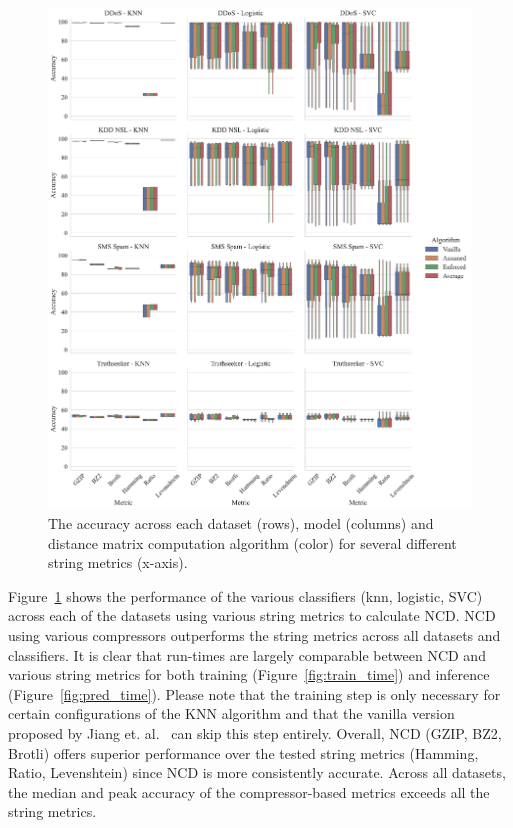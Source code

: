 \documentclass[conference]{IEEEtran}
\begin{document}
\begin{figure}[htb]
    \centering
    \includegraphics[width=\textwidth]{images/accuracy_vs_algorithm.pdf}
    \caption{The accuracy across each dataset (rows), model (columns) and distance matrix computation algorithm (color) for several different string metrics (x-axis).}
    \label{fig:metric_acc}
\end{figure}

Figure~\ref{fig:metric_acc} shows the performance of the various classifiers (knn, logistic, SVC) across each of the datasets using various string metrics to calculate NCD. 
NCD using various compressors outperforms the string metrics across all datasets and classifiers. 
It is clear that run-times are largely comparable between NCD and various string metrics for both training (Figure~\ref{fig:train_time}) and inference (Figure~\ref{fig:pred_time}). 
Please note that the training step is only necessary for certain configurations of the KNN algorithm and that the vanilla version proposed by Jiang et. al.~\cite{jiang2022less} can skip this step entirely. 
Overall, NCD (GZIP, BZ2, Brotli) offers superior performance over the tested string metrics (Hamming, Ratio, Levenshtein) since NCD is more consistently accurate. Across all datasets, the median and peak accuracy of the compressor-based metrics exceeds all the string metrics.
\end{document}
